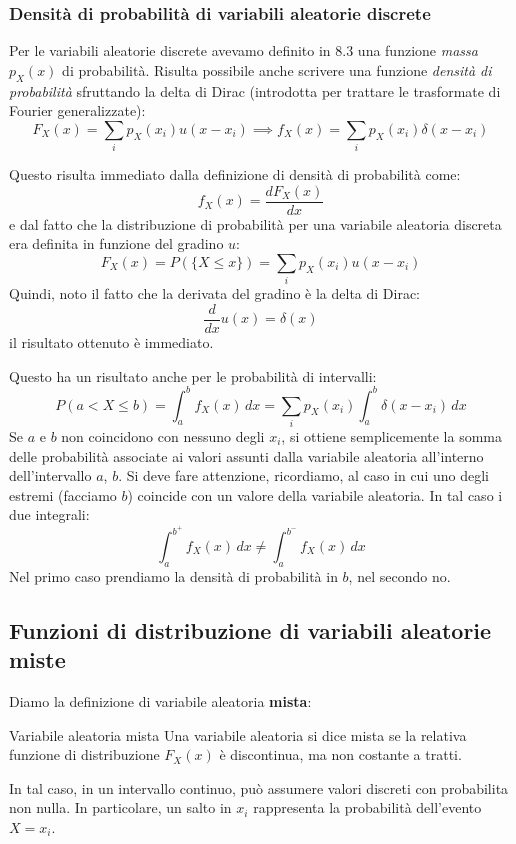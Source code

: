 \documentclass[a4paper,11pt]{article}
\begin{document}
\subsubsection{Densità di probabilità di variabili aleatorie discrete}
Per le variabili aleatorie discrete avevamo definito in 8.3 una funzione \textit{massa} $p_X(x)$ di probabilità. Risulta possibile anche scrivere una funzione \textit{densità di probabilità} sfruttando la delta di Dirac (introdotta per trattare le trasformate di Fourier generalizzate):
$$
F_X(x) = \sum_i p_X (x_i) u (x - x_i) \implies f_X(x) = \sum_i p_X(x_i) \delta(x - x_i)
$$

Questo risulta immediato dalla definizione di densità di probabilità come:
$$
f_X(x) = \frac{d F_X(x) }{dx}
$$
e dal fatto che la distribuzione di probabilità per una variabile aleatoria discreta era definita in funzione del gradino $u$:
$$
F_X(x) = P(\{ X \leq x \}) = \sum_i p_X (x_i) u (x - x_i)
$$
Quindi, noto il fatto che la derivata del gradino è la delta di Dirac:
$$
\frac{d}{dx} u(x) = \delta(x)
$$
il risultato ottenuto è immediato.

Questo ha un risultato anche per le probabilità di intervalli:
$$
P(a < X \leq b) = \int_a^b f_X(x) \, dx = \sum_i p_X(x_i) \int_a^b \delta(x - x_i) \, dx
$$
Se $a$ e $b$ non coincidono con nessuno degli $x_i$, si ottiene semplicemente la somma delle probabilità associate ai valori assunti dalla variabile aleatoria all'interno dell'intervallo $a$, $b$. Si deve fare attenzione, ricordiamo, al caso in cui uno degli estremi (facciamo $b$) coincide con un valore della variabile aleatoria. In tal caso i due integrali:
$$
\int_a^{b^+} f_X(x) \, dx \neq \int_a^{b^-} f_X(x) \, dx
$$
Nel primo caso prendiamo la densità di probabilità in $b$, nel secondo no. 

\subsection{Funzioni di distribuzione di variabili aleatorie miste}
Diamo la definizione di variabile aleatoria \textbf{mista}:
\begin{definition}{Variabile aleatoria mista}
	Una variabile aleatoria si dice mista se la relativa funzione di distribuzione $F_X(x)$ è discontinua, ma non costante a tratti.
\end{definition}

In tal caso, in un intervallo continuo, può assumere valori discreti con probabilita non nulla. In particolare, un salto in $x_i$ rappresenta la probabilità dell'evento $X = x_i$. 
\end{document}
